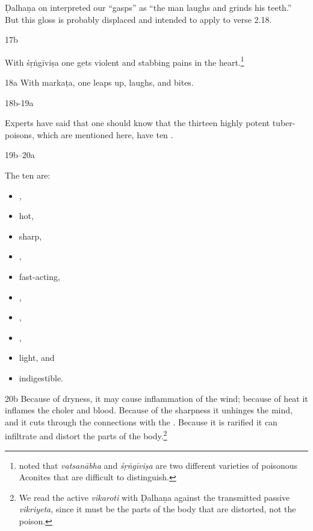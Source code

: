 \begin{translation}
{Ḍalhaṇa on  interpreted our “gasps” as “the man laughs 
and grinds his teeth.”  But this gloss is probably displaced and intended to 
apply to verse 2.18.}


\item[ 17b] 

With \gls{śṛṅgīviṣa}
one gets violent
 and stabbing pains in the 
heart.\footnote{\citet[407]{gvdb} noted that \emph{vatsanābha} and 
\emph{śṛṅgīviṣa} are two different varieties of poisonous Aconites that are 
difficult to distinguish.}
    
    \item[ 18a]
    With
    \gls{markaṭa}, one leaps up, laughs, and 
    bites.
    
    
    \item[ 18b-19a]
    
    Experts have said that one should know that the thirteen highly potent 
    tuber-poisons, which are mentioned here, have ten .
    
    \item[ 19b--20a]
    
    The ten are:
    \begin{itemize}
        \item    {}, 
        \item hot, 
        \item sharp, 
        \item {},
        \item     fast-acting, 
        \item {}, 
        \item {}, 
        \item {},
        \item     light, and 
        \item indigestible.    
    \end{itemize}
    \item[ 20b]
    Because of dryness, it may cause inflammation of the wind; because of heat
    it inflames the choler and blood. 
    Because of the sharpness it unhinges the
    mind, and it cuts through the connections with the .  Because it is rarified it can infiltrate and distort
    the parts of the body.\footnote{We read the active \emph{vikaroti} with 
    Ḍalhaṇa against the 
    transmitted passive \emph{vikriyeta}, since it must be the parts of the body 
    that are distorted, not the poison.}    
    


\end{translation}
